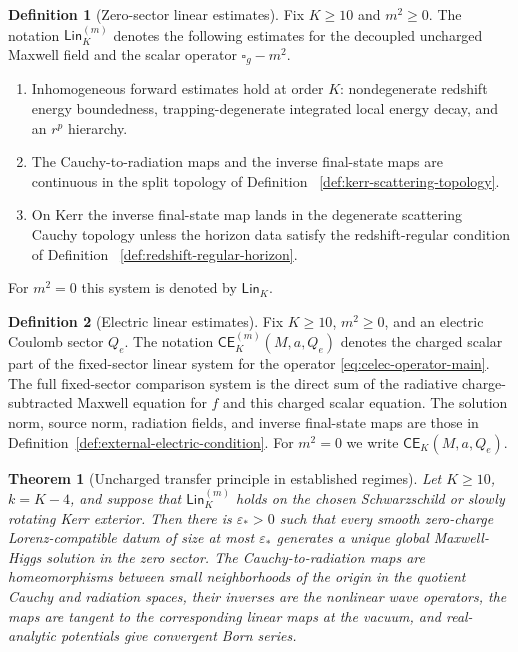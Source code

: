 \documentclass[11pt]{article}
\numberwithin{equation}{section}
\theoremstyle{plain}
\newtheorem{theorem}{Theorem}[section]
\theoremstyle{definition}
\newtheorem{definition}{Definition}[section]
\theoremstyle{remark}
\newcommand{\Lin}{\mathsf{Lin}}
\newcommand{\CElec}{\mathsf{CE}}
\begin{document}
\begin{definition}[Zero-sector linear estimates]\label{def:charged-linear-estimates}
Fix $K\ge10$ and $m^2\ge0$.  The notation $\Lin_K^{(m)}$ denotes the following estimates for the decoupled uncharged Maxwell field and the scalar operator $\square_g-m^2$.
\begin{enumerate}
\item Inhomogeneous forward estimates hold at order $K$: nondegenerate redshift energy boundedness, trapping-degenerate integrated local energy decay, and an $r^p$ hierarchy.
\item The Cauchy-to-radiation maps and the inverse final-state maps are continuous in the split topology of Definition~
\ref{def:kerr-scattering-topology}.
\item On Kerr the inverse final-state map lands in the degenerate scattering Cauchy topology unless the horizon data satisfy the redshift-regular condition of Definition~
\ref{def:redshift-regular-horizon}.
\end{enumerate}
For $m^2=0$ this system is denoted by $\Lin_K$.
\end{definition}


\begin{definition}[Electric linear estimates]\label{def:electric-linear-estimates}
Fix \(K\ge10\), \(m^2\ge0\), and an electric Coulomb sector \(Q_e\).  The notation \(\CElec^{(m)}_K(M,a,Q_e)\) denotes the charged scalar part of the fixed-sector linear system for the operator \eqref{eq:celec-operator-main}.  The full fixed-sector comparison system is the direct sum of the radiative charge-subtracted Maxwell equation for \(f\) and this charged scalar equation.  The solution norm, source norm, radiation fields, and inverse final-state maps are those in Definition~\ref{def:external-electric-condition}.  For \(m^2=0\) we write \(\CElec_K(M,a,Q_e)\).
\end{definition}

\begin{theorem}[Uncharged transfer principle in established regimes]\label{thm:charged-sector-transfer}
Let $K\ge10$, $k=K-4$, and suppose that $\Lin_K^{(m)}$ holds on the chosen Schwarzschild or slowly rotating Kerr exterior.  Then there is $\varepsilon_*>0$ such that every smooth zero-charge Lorenz-compatible datum of size at most $\varepsilon_*$ generates a unique global Maxwell-Higgs solution in the zero sector.  The Cauchy-to-radiation maps are homeomorphisms between small neighborhoods of the origin in the quotient Cauchy and radiation spaces, their inverses are the nonlinear wave operators, the maps are tangent to the corresponding linear maps at the vacuum, and real-analytic potentials give convergent Born series.
\end{theorem}
\end{document}
